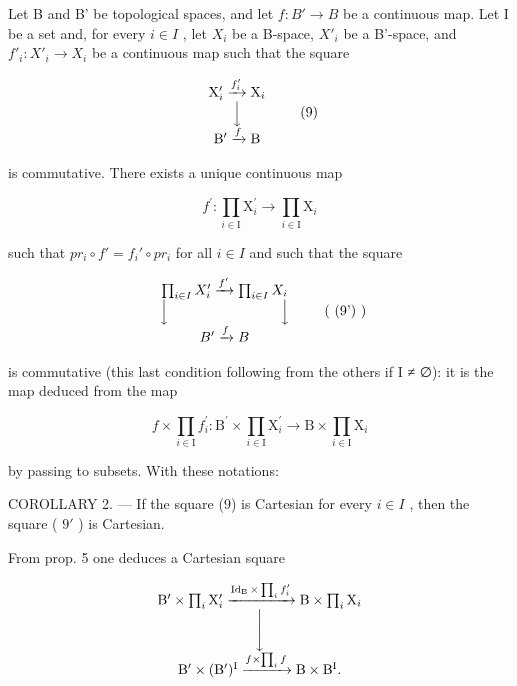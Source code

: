 Let B and B' be topological spaces, and let \(f: B' \to B\) be a continuous map. Let I be a set and, for every \(i \in I\) , let \(X_i\) be a B-space, \(X'_i\) be a B'-space, and \(f'_i: X'_i \to X_i\) be a continuous map such that the square

\[
\begin{array}{c} \mathrm{X} _ {i} ^ {\prime} \xrightarrow {f _ {i} ^ {\prime}} \mathrm{X} _ {i} \\ \Big \downarrow \\ \mathrm{B} ^ {\prime} \xrightarrow {f} \mathrm{B} \end{array}\tag{9}
\]

is commutative. There exists a unique continuous map

\[
f ^ {\prime} \colon \prod_ {i \in \mathrm{I}} \mathrm{X} _ {i} ^ {\prime} \to \prod_ {i \in \mathrm{I}} \mathrm{X} _ {i}
\]

such that \(pr_{i} \circ f' = f_{i}' \circ pr_{i}\) for all \(i \in I\) and such that the square

\[
\begin{array}{c} \prod_ {i \in I} X _ {i} ^ {\prime} \xrightarrow {f ^ {\prime}} \prod_ {i \in I} X _ {i} \\ \Big \downarrow \qquad \qquad \qquad \qquad \Big \downarrow \\ B ^ {\prime} \xrightarrow {f} B \end{array}\tag{ (9') }
\]

is commutative (this last condition following from the others if I ≠ ∅): it is the map deduced from the map

\[
f \times \prod_ {i \in \mathrm{I}} f _ {i} ^ {\prime} \colon \mathrm{B} ^ {\prime} \times \prod_ {i \in \mathrm{I}} \mathrm{X} _ {i} ^ {\prime} \to \mathrm{B} \times \prod_ {i \in \mathrm{I}} \mathrm{X} _ {i}
\]

by passing to subsets. With these notations:

COROLLARY 2. --- If the square (9) is Cartesian for every \(i \in I\) , then the square ( \(9'\) ) is Cartesian.

From prop. 5 one deduces a Cartesian square

\[
\begin{array}{c} \mathrm{B} ^ {\prime} \times \prod_ {i} \mathrm{X} _ {i} ^ {\prime} \xrightarrow {\operatorname{Id} _ {\mathrm{B}} \times \prod_ {i} f _ {i} ^ {\prime}} \mathrm{B} \times \prod_ {i} \mathrm{X} _ {i} \\ \Biggl \downarrow \\ \mathrm{B} ^ {\prime} \times (\mathrm{B} ^ {\prime}) ^ {\mathrm{I}} \xrightarrow {f \times \prod_ {i} f} \mathrm{B} \times \mathrm{B} ^ {\mathrm{I}}  . \end{array}
\]

